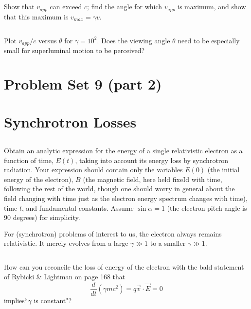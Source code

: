 \documentclass[11pt]{article}
\begin{document}
\subsection{}
Show that $v_{app}$ can exceed $c$; find the angle for which $v_{app}$ is maximum,
and show that this maximum is $v_{max}=\gamma v$.

\subsection{}
Plot $v_{app}/c$ versus $\theta$ for $\gamma=10^2$.  Does the viewing angle $\theta$
need to be especially small for superluminal motion to be perceived?

\section*{Problem Set 9 (part 2)}

\section{Synchrotron Losses}

\subsection{}
Obtain an analytic expression for the energy of a single relativistic
electron as a function of time, $E(t)$, taking into account its energy loss by
synchrotron radiation. Your expression should contain only the variables $E(0)$
(the initial energy of the electron), $B$ (the magnetic field, here held fixeId
with time, following the rest of the world, though one should worry in general
about the field changing with time just as the electron energy spectrum changes
with time), time $t$, and fundamental constants. Assume $\sin\alpha=1$ (the electron
pitch angle is 90 degrees) for simplicity.

For (synchrotron) problems of interest to us, the electron always remains
relativistic. It merely evolves from a large $\gamma\gg1$ to a smaller $\gamma\gg1$.

\subsection{}
How can you reconcile the loss of energy of the electron with the bald
statement of Rybicki \& Lightman on page 168 that 
\begin{equation}
\frac{d}{dt}(\gamma mc^2)=q\vec v\cdot \vec E=0
\end{equation}
implies``$\gamma$ is constant"?
\end{document}

